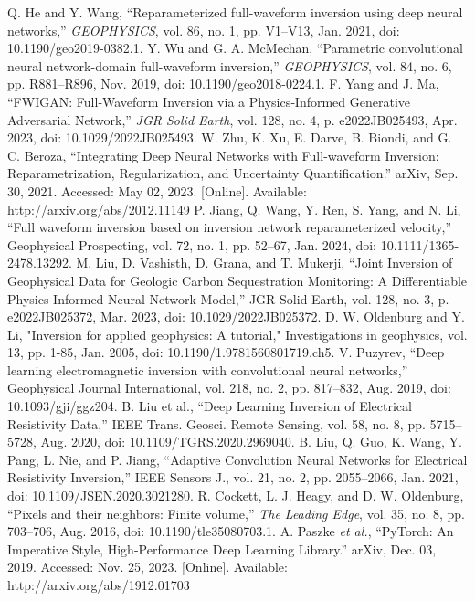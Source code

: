 \documentclass[lettersize,journal]{IEEEtran}
\begin{document}
\begin{thebibliography}{1}
Q. He and Y. Wang, “Reparameterized full-waveform inversion using deep neural networks,” \textit{GEOPHYSICS}, vol. 86, no. 1, pp. V1–V13, Jan. 2021, doi: 10.1190/geo2019-0382.1.
Y. Wu and G. A. McMechan, “Parametric convolutional neural network-domain full-waveform inversion,” \textit{GEOPHYSICS}, vol. 84, no. 6, pp. R881–R896, Nov. 2019, doi: 10.1190/geo2018-0224.1.
F. Yang and J. Ma, “FWIGAN: Full‐Waveform Inversion via a Physics‐Informed Generative Adversarial Network,” \textit{JGR Solid Earth}, vol. 128, no. 4, p. e2022JB025493, Apr. 2023, doi: 10.1029/2022JB025493.
W. Zhu, K. Xu, E. Darve, B. Biondi, and G. C. Beroza, “Integrating Deep Neural Networks with Full-waveform Inversion: Reparametrization, Regularization, and Uncertainty Quantification.” arXiv, Sep. 30, 2021. Accessed: May 02, 2023. [Online]. Available: http://arxiv.org/abs/2012.11149
P. Jiang, Q. Wang, Y. Ren, S. Yang, and N. Li, “Full waveform inversion based on inversion network reparameterized velocity,” Geophysical Prospecting, vol. 72, no. 1, pp. 52–67, Jan. 2024, doi: 10.1111/1365-2478.13292.
M. Liu, D. Vashisth, D. Grana, and T. Mukerji, “Joint Inversion of Geophysical Data for Geologic Carbon Sequestration Monitoring: A Differentiable Physics‐Informed Neural Network Model,” JGR Solid Earth, vol. 128, no. 3, p. e2022JB025372, Mar. 2023, doi: 10.1029/2022JB025372.
D. W. Oldenburg and Y. Li, "Inversion for applied geophysics: A tutorial," Investigations in geophysics, vol. 13, pp. 1-85, Jan. 2005, doi: 10.1190/1.9781560801719.ch5.
V. Puzyrev, “Deep learning electromagnetic inversion with convolutional neural networks,” Geophysical Journal International, vol. 218, no. 2, pp. 817–832, Aug. 2019, doi: 10.1093/gji/ggz204.
B. Liu et al., “Deep Learning Inversion of Electrical Resistivity Data,” IEEE Trans. Geosci. Remote Sensing, vol. 58, no. 8, pp. 5715–5728, Aug. 2020, doi: 10.1109/TGRS.2020.2969040.
B. Liu, Q. Guo, K. Wang, Y. Pang, L. Nie, and P. Jiang, “Adaptive Convolution Neural Networks for Electrical Resistivity Inversion,” IEEE Sensors J., vol. 21, no. 2, pp. 2055–2066, Jan. 2021, doi: 10.1109/JSEN.2020.3021280.
R. Cockett, L. J. Heagy, and D. W. Oldenburg, “Pixels and their neighbors: Finite volume,” \textit{The Leading Edge}, vol. 35, no. 8, pp. 703–706, Aug. 2016, doi: 10.1190/tle35080703.1.
A. Paszke \textit{et al.}, “PyTorch: An Imperative Style, High-Performance Deep Learning Library.” arXiv, Dec. 03, 2019. Accessed: Nov. 25, 2023. [Online]. Available: http://arxiv.org/abs/1912.01703

\end{thebibliography}
\end{document}
